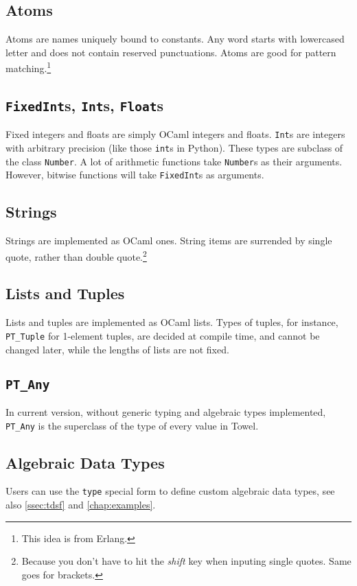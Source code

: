 \documentclass{book}
\begin{document}
\subsection{Atoms}
Atoms are names uniquely bound to constants. Any word starts with lowercased letter and does not contain reserved punctuations. Atoms are good for pattern matching.\footnote{This idea is from Erlang.}

\subsection{\texttt{FixedInt}s, \texttt{Int}s, \texttt{Float}s}
Fixed integers and floats are simply OCaml integers and floats. \texttt{Int}s are integers with arbitrary precision (like those \texttt{int}s in Python). These types are subclass of the class \texttt{Number}. A lot of arithmetic functions take \texttt{Number}s as their arguments. However, bitwise functions will take \texttt{FixedInt}s as arguments.

\subsection{Strings}
Strings are implemented as OCaml ones. String items are surrended by single quote, rather than double quote.\footnote{Because you don't have to hit the \textit{shift} key when inputing single quotes. Same goes for brackets.}

\subsection{Lists and Tuples}
Lists and tuples are implemented as OCaml lists. Types of tuples, for instance, \texttt{PT\_Tuple} for 1-element tuples, are decided at compile time, and cannot be changed later, while the lengths of lists are not fixed.

\subsection{\texttt{PT\_Any}}
In current version, without generic typing and algebraic types implemented, \texttt{PT\_Any} is the superclass of the type of every value in Towel.

\subsection{Algebraic Data Types}
Users can use the \texttt{type} special form to define custom algebraic data types, see also \autoref{ssec:tdsf} and \autoref{chap:examples}.
\end{document}
